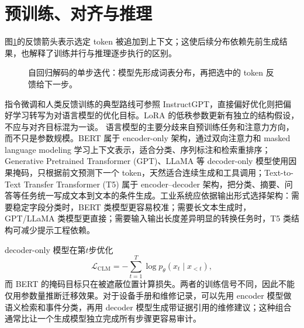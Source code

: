 \section{预训练、对齐与推理}
图\ref{fig:llm-decoding-loop}的反馈箭头表示选定 token 被追加到上下文；这使后续分布依赖先前生成结果，也解释了训练并行与推理逐步执行的区别。
\begin{figure}[htbp]
\centering
{}
\caption{自回归解码的单步迭代：模型先形成词表分布，再把选中的 token 反馈给下一步。}
\label{fig:llm-decoding-loop}
\end{figure}
指令微调和人类反馈训练的典型路线可参照 InstructGPT，直接偏好优化则把偏好学习转写为对语言模型的优化目标\cite{ouyang2022instruct,rafailov2023dpo}。LoRA 的低秩参数更新有独立的结构假设\cite{hu2021lora}，不应与对齐目标混为一谈。
语言模型的主要分歧来自预训练任务和注意力方向，而不只是参数规模。BERT 属于 encoder-only 架构，通过双向注意力和 masked language modeling 学习上下文表示，适合分类、序列标注和检索重排序；Generative Pretrained Transformer (GPT)、LLaMA 等 decoder-only 模型使用因果掩码，只根据前文预测下一个 token，天然适合连续生成和工具调用；Text-to-Text Transfer Transformer (T5) 属于 encoder--decoder 架构，把分类、摘要、问答等任务统一写成文本到文本的条件生成。工业系统应依据输出形式选择架构：需要稳定字段分类时，BERT 类模型更容易校准；需要长文本生成时，GPT/LLaMA 类模型更直接；需要输入输出长度差异明显的转换任务时，T5 类结构可减少提示工程依赖。

decoder-only 模型在第$t$步优化
\begin{equation}
 \mathcal{L}_{\mathrm{CLM}}=-\sum_{t=1}^{T}\log p_\theta(x_t\mid x_{<t}),
\end{equation}
而 BERT 的掩码目标只在被遮蔽位置计算损失。两者的训练信号不同，因此不能仅用参数量推断迁移效果。对于设备手册和维修记录，可以先用 encoder 模型做语义检索和事件分类，再用 decoder 模型生成带证据引用的维修建议；这种组合通常比让一个生成模型独立完成所有步骤更容易审计。

